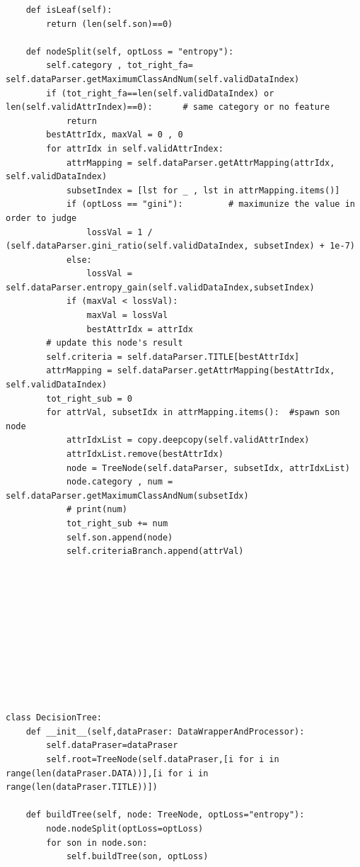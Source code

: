 \documentclass{ctexart}
\begin{document}
\begin{lstlisting}
    def isLeaf(self):
        return (len(self.son)==0)

    def nodeSplit(self, optLoss = "entropy"):
        self.category , tot_right_fa= self.dataParser.getMaximumClassAndNum(self.validDataIndex)
        if (tot_right_fa==len(self.validDataIndex) or len(self.validAttrIndex)==0):      # same category or no feature
            return
        bestAttrIdx, maxVal = 0 , 0
        for attrIdx in self.validAttrIndex:
            attrMapping = self.dataParser.getAttrMapping(attrIdx, self.validDataIndex)
            subsetIndex = [lst for _ , lst in attrMapping.items()]
            if (optLoss == "gini"):         # maximunize the value in order to judge
                lossVal = 1 / (self.dataParser.gini_ratio(self.validDataIndex, subsetIndex) + 1e-7)
            else:
                lossVal = self.dataParser.entropy_gain(self.validDataIndex,subsetIndex)
            if (maxVal < lossVal):
                maxVal = lossVal
                bestAttrIdx = attrIdx
        # update this node's result
        self.criteria = self.dataParser.TITLE[bestAttrIdx]
        attrMapping = self.dataParser.getAttrMapping(bestAttrIdx, self.validDataIndex)
        tot_right_sub = 0
        for attrVal, subsetIdx in attrMapping.items():  #spawn son node
            attrIdxList = copy.deepcopy(self.validAttrIndex)
            attrIdxList.remove(bestAttrIdx)
            node = TreeNode(self.dataParser, subsetIdx, attrIdxList)
            node.category , num = self.dataParser.getMaximumClassAndNum(subsetIdx)
            # print(num)
            tot_right_sub += num
            self.son.append(node)
            self.criteriaBranch.append(attrVal)
    










class DecisionTree:
    def __init__(self,dataPraser: DataWrapperAndProcessor):
        self.dataPraser=dataPraser
        self.root=TreeNode(self.dataPraser,[i for i in range(len(dataPraser.DATA))],[i for i in range(len(dataPraser.TITLE))])
        
    def buildTree(self, node: TreeNode, optLoss="entropy"):
        node.nodeSplit(optLoss=optLoss)
        for son in node.son:
            self.buildTree(son, optLoss)
    

\end{lstlisting}
\end{document}
